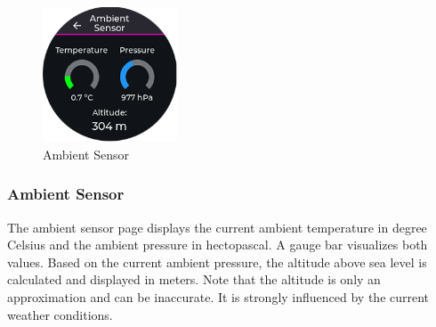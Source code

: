 \begin{minipage}{\linewidth}
	\begin{figure}
		\vspace{-0.6cm}
		\includegraphics[width=4cm]{images/6_design_final/gui/12_ambient_sensor.png}
		\centering
		\caption{Ambient Sensor}
		\label{fig:final_design_gui_ambient_sensor}
	\end{figure}
	\subsubsection{Ambient Sensor}
	The ambient sensor page displays the current ambient temperature in degree Celsius and the ambient pressure in hectopascal.
	A gauge bar visualizes both values.
	Based on the current ambient pressure, the altitude above sea level is calculated and displayed in meters.
	Note that the altitude is only an approximation and can be inaccurate.
	It is strongly influenced by the current weather conditions.
\end{minipage}
\vspace{0.5cm}

